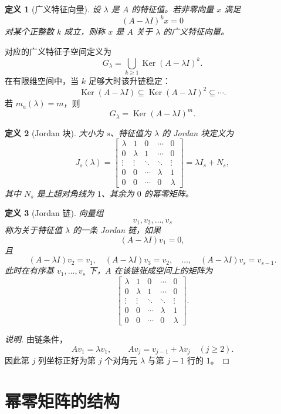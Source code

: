 \documentclass[UTF8,openany,zihao=-4]{ctexbook}
\theoremstyle{cnplain}
\newtheorem{definition}{定义}[chapter]
\newcommand{\Ker}{\operatorname{Ker}}
\begin{document}
\begin{definition}[广义特征向量]
设 $\lambda$ 是 $A$ 的特征值。若非零向量 $x$ 满足
\[
(A-\lambda I)^k x=0
\]
对某个正整数 $k$ 成立，则称 $x$ 是 $A$ 关于 $\lambda$ 的广义特征向量。
\end{definition}

对应的广义特征子空间定义为
\[
G_\lambda=\bigcup_{k\ge1}\Ker(A-\lambda I)^k.
\]
在有限维空间中，当 $k$ 足够大时该升链稳定：
\[
\Ker(A-\lambda I)
\subseteq \Ker(A-\lambda I)^2
\subseteq\cdots.
\]
若 $m_a(\lambda)=m$，则
\[
G_\lambda=\Ker(A-\lambda I)^m.
\]

\begin{definition}[Jordan 块]
大小为 $s$、特征值为 $\lambda$ 的 Jordan 块定义为
\[
J_s(\lambda)=
\begin{bmatrix}
\lambda&1&0&\cdots&0\\
0&\lambda&1&\cdots&0\\
\vdots&\vdots&\ddots&\ddots&\vdots\\
0&0&\cdots&\lambda&1\\
0&0&\cdots&0&\lambda
\end{bmatrix}
=\lambda I_s+N_s,
\]
其中 $N_s$ 是上超对角线为 $1$、其余为 $0$ 的幂零矩阵。
\end{definition}

\begin{definition}[Jordan 链]
向量组
\[
v_1,v_2,
\ldots,v_s
\]
称为关于特征值 $\lambda$ 的一条 Jordan 链，如果
\[
(A-\lambda I)v_1=0,
\]
且
\[
(A-\lambda I)v_2=v_1,
\quad
(A-\lambda I)v_3=v_2,
\quad \ldots,\quad
(A-\lambda I)v_s=v_{s-1}.
\]
此时在有序基 $v_1,
\ldots,v_s$ 下，$A$ 在该链张成空间上的矩阵为
\[
\begin{bmatrix}
\lambda&1&0&\cdots&0\\
0&\lambda&1&\cdots&0\\
\vdots&\vdots&\ddots&\ddots&\vdots\\
0&0&\cdots&\lambda&1\\
0&0&\cdots&0&\lambda
\end{bmatrix}.
\]
\end{definition}

\begin{proof}[说明]
由链条件，
\[
Av_1=\lambda v_1,
\qquad
Av_j=v_{j-1}+\lambda v_j\quad (j\ge2).
\]
因此第 $j$ 列坐标正好为第 $j$ 个对角元 $\lambda$ 与第 $j-1$ 行的 $1$。
\end{proof}

\section{幂零矩阵的结构}
\end{document}
